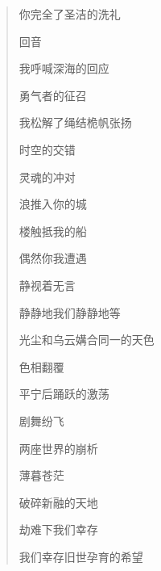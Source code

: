 \begin{verse}
{        你完全了圣洁的洗礼

        \vspace*{2\ccwd}
        
        回音

        我呼喊深海的回应

        勇气者的征召

        我松解了绳结桅帆张扬

        \vspace*{2\ccwd}
        
        时空的交错

        灵魂的冲对

        浪推入你的城

        楼触抵我的船

        偶然你我遭遇

        静视着无言

        静静地我们静静地等

        光尘和乌云媾合同一的天色

        \vspace*{2\ccwd}
        
        色相翻覆

        平宁后踊跃的激荡

        剧舞纷飞

        两座世界的崩析

        薄暮苍茫

        破碎新融的天地

        劫难下我们幸存

        我们幸存旧世孕育的希望        
    }
\end{verse}
\newpage